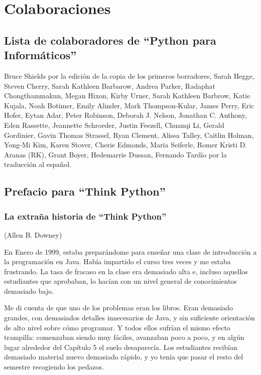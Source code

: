 
\chapter{Colaboraciones}
\section*{Lista de colaboradores de ``Python para Informáticos''}

Bruce Shields por la edición de la copia de los primeros borradores,
Sarah Hegge,
Steven Cherry,
Sarah Kathleen Barbarow,
Andrea Parker,
Radaphat Chongthammakun,
Megan Hixon,
Kirby Urner,
Sarah Kathleen Barbrow,
Katie Kujala,
Noah Botimer,
Emily Alinder,
Mark Thompson-Kular,
James Perry,
Eric Hofer,
Eytan Adar,
Peter Robinson,
Deborah J. Nelson,
Jonathan C. Anthony,
Eden Rassette,
Jeannette Schroeder,
Justin Feezell,
Chuanqi Li,
Gerald Gordinier,
Gavin Thomas Strassel,
Ryan Clement,
Alissa Talley,
Caitlin Holman,
Yong-Mi Kim,
Karen Stover,
Cherie Edmonds,
Maria Seiferle,
Romer Kristi D. Aranas (RK),
Grant Boyer,
Hedemarrie Dussan,
Fernando Tardío por la traducción al español.


\section*{Prefacio para ``Think Python''}

\subsection*{La extraña historia de ``Think Python''}

(Allen B. Downey)

En Enero de 1999, estaba preparándome para enseñar una clase de introducción
a la programación en Java. Había impartido el curso tres veces y me estaba
frustrando. La tasa de fracaso en la clase era demasiado alta e, incluso
aquellos estudiantes que aprobaban, lo hacían con un nivel general de conocimientos
demasiado bajo.

Me di cuenta de que uno de los problemas eran los libros.
Eran demasiado grandes, con demasiados detalles innecesarios de Java, y
sin suficiente orientación de alto nivel sobre cómo programar. Y todos ellos
sufrían el mismo efecto trampilla: comenzaban siendo muy fáciles,
avanzaban poco a poco, y en algún lugar alrededor del Capítulo 5 el suelo
desaparecía. Los estudiantes recibían demasiado material nuevo demasiado rápido,
y yo tenía que pasar el resto del semestre recogiendo los pedazos.

